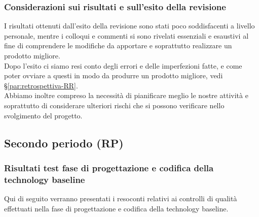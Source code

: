 \documentclass[../piano_di_qualifica.tex]{subfiles}
\begin{document}
\subsubsection{Considerazioni sui risultati e sull’esito della revisione}
I risultati ottenuti dall’esito della revisione sono stati poco soddisfacenti a livello personale, mentre i colloqui e commenti si sono rivelati essenziali e esaustivi al fine di comprendere le modifiche da apportare e soprattutto realizzare un prodotto migliore. \\
Dopo l'esito ci siamo resi conto degli errori e delle imperfezioni fatte, e come poter ovviare a questi in modo da produrre un prodotto migliore, vedi \S\ref{par:retrospettiva-RR}. \\
Abbiamo inoltre compreso la necessità di pianificare meglio le nostre attività e soprattutto di considerare ulteriori rischi che si possono verificare nello svolgimento del progetto.


\subsection{Secondo periodo (RP)}
\label{sub:periodo-RP}
\subsubsection{Risultati test fase di progettazione e codifica della technology baseline}
Qui di seguito verranno presentati i resoconti relativi ai controlli di qualità effettuati nella fase di progettazione e codifica della technology baseline.
\end{document}
